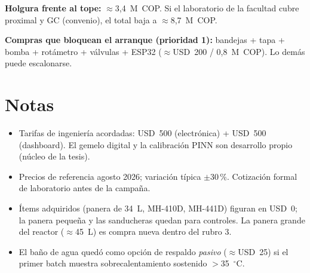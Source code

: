 \documentclass[11pt,a4paper]{article}
\begin{document}
\noindent\textbf{Holgura frente al tope:} ${\approx}$3,4~M~COP. Si el
laboratorio de la facultad cubre proximal y GC (convenio), el total baja a
${\approx}$8,7~M~COP.

\medskip
\noindent\textbf{Compras que bloquean el arranque (prioridad 1):} bandejas +
tapa + bomba + rotámetro + válvulas + ESP32 (${\approx}$USD~200 / 0,8~M~COP).
Lo demás puede escalonarse.

\section*{Notas}
\begin{itemize}
  \item Tarifas de ingeniería acordadas: USD~500 (electrónica) + USD~500
        (dashboard). El gemelo digital y la calibración PINN son desarrollo
        propio (núcleo de la tesis).
  \item Precios de referencia agosto 2026; variación típica $\pm$30\,\%.
        Cotización formal de laboratorio antes de la campaña.
  \item Ítems adquiridos (panera de 34~L, MH-410D, MH-441D) figuran en
        USD~0; la panera pequeña y las sanducheras quedan para controles.
        La panera grande del reactor (${\approx}$45~L) es compra nueva
        dentro del rubro 3.
  \item El baño de agua quedó como opción de respaldo \emph{pasivo}
        (${\approx}$USD~25) si el primer batch muestra sobrecalentamiento
        sostenido $>$35~$^\circ$C.
\end{itemize}
\end{document}
